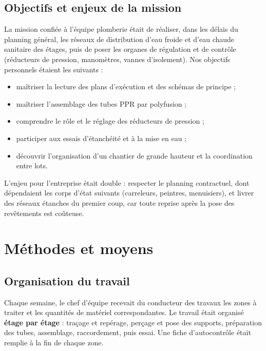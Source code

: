 \subsection{Objectifs et enjeux de la mission}
La mission confiée à l'équipe plomberie était de réaliser, dans les délais du planning général,
les réseaux de distribution d'eau froide et d'eau chaude sanitaire des étages, puis de poser
les organes de régulation et de contrôle (réducteurs de pression, manomètres, vannes
d'isolement). Nos objectifs personnels étaient les suivants :
\begin{itemize}
  \item maîtriser la lecture des plans d'exécution et des schémas de principe ;
  \item maîtriser l'assemblage des tubes PPR par polyfusion ;
  \item comprendre le rôle et le réglage des réducteurs de pression ;
  \item participer aux essais d'étanchéité et à la mise en eau ;
  \item découvrir l'organisation d'un chantier de grande hauteur et la coordination entre lots.
\end{itemize}
L'enjeu pour l'entreprise était double : respecter le planning contractuel, dont dépendaient les
corps d'état suivants (carreleurs, peintres, menuisiers), et livrer des réseaux étanches du
premier coup, car toute reprise après la pose des revêtements est coûteuse.

\section{Méthodes et moyens}

\subsection{Organisation du travail}
Chaque semaine, le chef d'équipe recevait du conducteur des travaux les zones à traiter et les
quantités de matériel correspondantes. Le travail était organisé \textbf{étage par étage} :
traçage et repérage, perçage et pose des supports, préparation des tubes, assemblage,
raccordement, puis essai. Une fiche d'autocontrôle était remplie à la fin de chaque zone.

